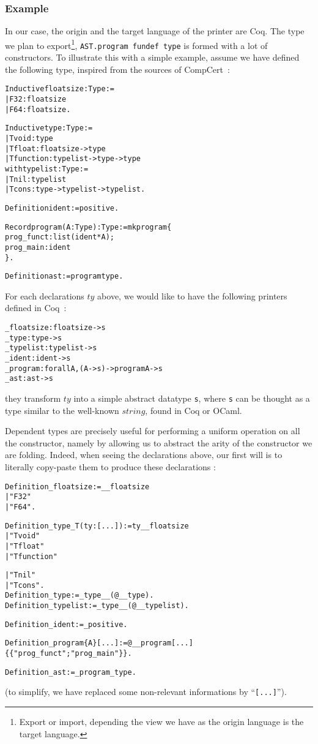 \documentclass[a4paper, 11pt]{article}
\newenvironment{coq}
  {%
   \begin{alltt}} %% 8.3pl1 (January 2011)
  {\end{alltt} %
  }
\begin{document}
\subsubsection{Example}
In our case, the origin and the target language of the printer are Coq. The type we plan to export\footnote{Export or import, depending the view we have as the origin language is the target language.}, \verb|AST.program fundef type| is formed with a lot of constructors. To illustrate this with a simple example, assume we have defined the following type, inspired from the sources of CompCert~:
\begin{coq}
Inductive floatsize : Type :=
  | F32: floatsize
  | F64: floatsize.

Inductive type : Type :=
  | Tvoid : type
  | Tfloat: floatsize -> type
  | Tfunction: typelist -> type -> type
with typelist : Type :=
  | Tnil : typelist
  | Tcons : type -> typelist -> typelist.

Definition ident := positive.

Record program (A : Type) : Type := mkprogram \{
  prog_funct : list (ident * A);
  prog_main : ident
\}.

Definition ast := program type.
\end{coq}
For each declarations $ty$ above, we would like to have the following printers defined in Coq~:
\begin{coq}
_floatsize : floatsize -> s
_type : type -> s
_typelist : typelist -> s
_ident : ident -> s
_program : forall A, (A -> s) -> program A -> s
_ast : ast -> s
\end{coq}
they transform $ty$ into a simple abstract datatype \verb|s|, where \verb|s| can be thought as a type similar to the well-known $string$, found in Coq or OCaml.

Dependent types are precisely useful for performing a uniform operation on all the constructor, namely by allowing us to abstract the arity of the constructor we are folding. Indeed, when seeing the declarations above, our first will is to literally copy-paste them to produce these declarations :
\begin{coq}
Definition _floatsize := __floatsize 
  | "F32" 
  | "F64".

Definition _type_ T (ty : [...]) := ty _ _floatsize
  | "Tvoid"
  | "Tfloat"
  | "Tfunction"

  | "Tnil"
  | "Tcons".
  Definition _type := _type_ _ (@__type).
  Definition _typelist := _type_ _ (@__typelist).

Definition _ident := _positive.

Definition _program \{A\} [...] := @__program [...]
  \{\{ "prog_funct" ; "prog_main" \}\}.

Definition _ast := _program _type.
\end{coq}
(to simplify, we have replaced some non-relevant informations by ``\verb|[...]|'').
\end{document}
